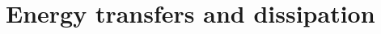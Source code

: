 \documentclass[../Rajarshi-thesis-draft.tex]{subfiles}
\begin{document}



 

\section{Energy transfers and dissipation}\label{edwv-cmp}
\end{document}
